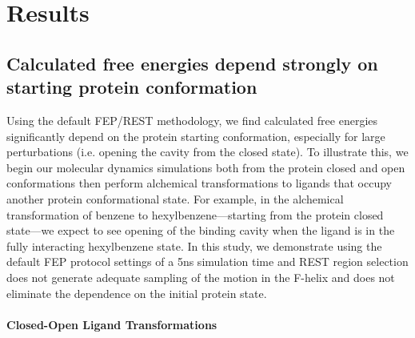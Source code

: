 \section{Results}

\subsection{Calculated free energies depend strongly on starting protein conformation}
Using the default FEP/REST methodology\cite{FEP/REST}, we find calculated free energies significantly depend on the protein starting conformation, especially for large perturbations (i.e. opening the cavity from the closed state).
To illustrate this, we begin our molecular dynamics simulations both from the protein closed and open conformations then perform alchemical transformations to ligands that occupy another protein conformational state.
For example, in the alchemical transformation of benzene to hexylbenzene---starting from the protein closed state---we expect to see opening of the binding cavity when the ligand is in the fully interacting hexylbenzene state.
In this study, we demonstrate using the default FEP protocol settings of a 5ns simulation time and REST region selection does not generate adequate sampling of the motion in the F-helix and does not eliminate the dependence on the initial protein state.

\paragraph{Closed-Open Ligand Transformations}

